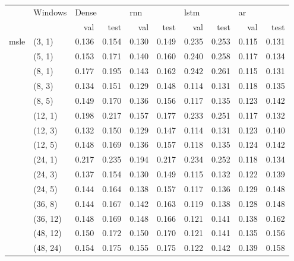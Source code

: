 \vspace{2em}

\begin{tabular}{ll|rr|rr|rr|rr}
\toprule
      &   Windows       & \multicolumn{2}{l}{Dense} & \multicolumn{2}{l}{\acrshort{rnn}} & \multicolumn{2}{l}{\acrshort{lstm}} & \multicolumn{2}{l}{\acrshort{ar}} \\*
      &          & val & test & val & test & val & test & val & test \\*
\midrule
\multirow{15}{*}{\acrshort{msle}}  & (3, 1) &     0.136 &      0.154 &   0.130 &    0.149 &    0.235 &     0.253 &  0.115 &   0.131 \\*
      & (5, 1) &     0.153 &      0.171 &   0.140 &    0.160 &    0.240 &     0.258 &  0.117 &   0.134 \\*
      & (8, 1) &     0.177 &      0.195 &   0.143 &    0.162 &    0.242 &     0.261 &  0.115 &   0.131 \\*
      & (8, 3) &     0.134 &      0.151 &   0.129 &    0.148 &    0.114 &     0.131 &  0.118 &   0.135 \\*
      & (8, 5) &     0.149 &      0.170 &   0.136 &    0.156 &    0.117 &     0.135 &  0.123 &   0.142 \\*
      & (12, 1) &     0.198 &      0.217 &   0.157 &    0.177 &    0.233 &     0.251 &  0.117 &   0.132 \\*
      & (12, 3) &     0.132 &      0.150 &   0.129 &    0.147 &    0.114 &     0.131 &  0.123 &   0.140 \\*
      & (12, 5) &     0.148 &      0.169 &   0.136 &    0.157 &    0.118 &     0.135 &  0.124 &   0.142 \\*
      & (24, 1) &     0.217 &      0.235 &   0.194 &    0.217 &    0.234 &     0.252 &  0.118 &   0.134 \\*
      & (24, 3) &     0.137 &      0.154 &   0.130 &    0.149 &    0.115 &     0.132 &  0.122 &   0.139 \\*
      & (24, 5) &     0.144 &      0.164 &   0.138 &    0.157 &    0.117 &     0.136 &  0.129 &   0.148 \\*
      & (36, 8) &     0.144 &      0.167 &   0.142 &    0.163 &    0.119 &     0.138 &  0.128 &   0.148 \\*
      & (36, 12) &     0.148 &      0.169 &   0.148 &    0.166 &    0.121 &     0.141 &  0.138 &   0.162 \\*
      & (48, 12) &     0.150 &      0.172 &   0.150 &    0.170 &    0.121 &     0.141 &  0.135 &   0.156 \\*
      & (48, 24) &     0.154 &      0.175 &   0.155 &    0.175 &    0.122 &     0.142 &  0.139 &   0.158 \\*
\bottomrule 
\end{tabular}

